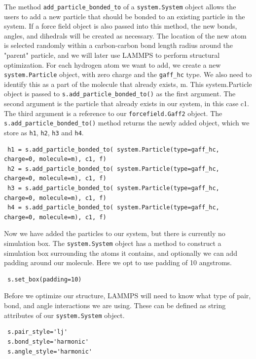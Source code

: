 \documentclass[9pt,tutorial]{livecoms}
\begin{document}
The method \lstinline$add_particle_bonded_to$ of a \lstinline$system.System$ object allows the users to add a new particle that should be bonded to an existing particle in the system. If a force field object is also passed into this method, the new bonds, angles, and dihedrals will be created as necessary. The location of the new atom is selected randomly within a carbon-carbon bond length radius around the "parent" particle, and we will later use LAMMPS to perform structural optimization. For each hydrogen atom we want to add, we create a new \lstinline$system.Particle$ object, with zero charge and the \lstinline$gaff_hc$ type. We also need to identify this as a part of the molecule that already exists, m. This system.Particle object is passed to \lstinline$s.add_particle_bonded_to()$ as the first argument. The second argument is the particle that already exists in our system, in this case c1. The third argument is a reference to our \lstinline$forcefield.Gaff2$ object. The \lstinline$s.add_particle_bonded_to()$ method returns the newly added object, which we store as \lstinline$h1$, \lstinline$h2$, \lstinline$h3$ and \lstinline$h4$.

\begin{lstlisting}
 h1 = s.add_particle_bonded_to( system.Particle(type=gaff_hc, charge=0, molecule=m), c1, f)
 h2 = s.add_particle_bonded_to( system.Particle(type=gaff_hc, charge=0, molecule=m), c1, f)
 h3 = s.add_particle_bonded_to( system.Particle(type=gaff_hc, charge=0, molecule=m), c1, f)
 h4 = s.add_particle_bonded_to( system.Particle(type=gaff_hc, charge=0, molecule=m), c1, f)
\end{lstlisting}

Now we have added the particles to our system, but there is currently no simulation box. The \lstinline$system.System$ object has a method to construct a simulation box surrounding the atoms it contains, and optionally we can add padding around our molecule. Here we opt to use padding of 10 angstroms.

\begin{lstlisting}
 s.set_box(padding=10)
\end{lstlisting}
Before we optimize our structure, LAMMPS will need to know what type of pair, bond, and angle interactions we are using. These can be defined as string attributes of our \lstinline$system.System$ object.

\begin{lstlisting}
 s.pair_style='lj'
 s.bond_style='harmonic'
 s.angle_style='harmonic'
\end{lstlisting}
\end{document}

